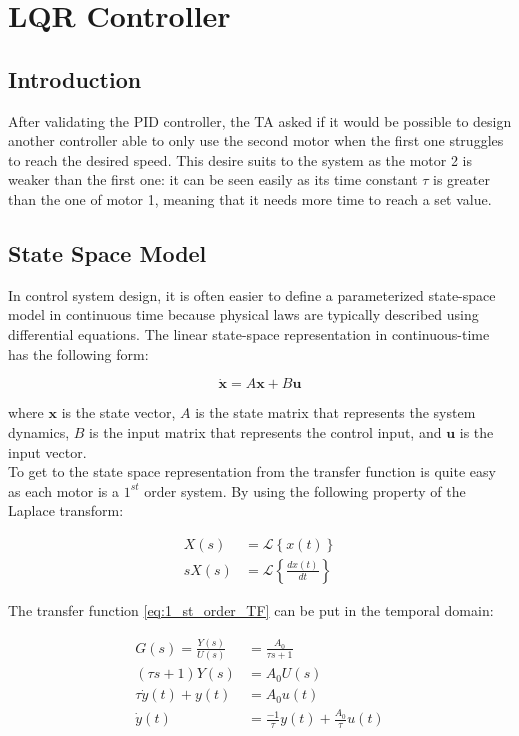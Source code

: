 \chapter{LQR Controller}

\section{Introduction}

After validating the PID controller, the TA asked if it would be possible to design another controller able to only use
the second motor when the first one struggles to reach the desired speed. This desire suits to the system as the motor 2
is weaker than the first one: it can be seen easily as its time constant $\tau$ is greater than the one of motor 1, 
meaning that it needs more time to reach a set value.

\section{State Space Model}
In control system design, it is often easier to define a parameterized state-space model in continuous time because 
physical laws are typically described using differential equations. The linear state-space representation in 
continuous-time has the following form:

\begin{equation}
    \dot{\mathbf{x}} = A \mathbf{x} + B \mathbf{u}
    \label{eq:state_space_models}
\end{equation}

where \( \mathbf{x} \) is the state vector, \( A \) is the state matrix that represents the system dynamics, 
\( B \) is the input matrix that represents the control input, and \( \mathbf{u} \) is the input vector.\\
To get to the state space representation from the transfer function is quite easy as each motor is a $1^{st}$ order
system. By using the following property of the Laplace transform:

\begin{align}
    X(s) &= \mathcal{L}\left\{x(t)\right\}\\
    s X(s) &= \mathcal{L}\left\{\frac{d x(t)}{dt}\right\}
\end{align}

The transfer function \ref{eq:1_st_order_TF} can be put in the temporal domain:

\begin{align}
    G(s) = \frac{Y(s)}{U(s)} &= \frac{A_0}{\tau s + 1}\\
    \left(\tau s + 1\right) Y(s) &= A_0 U(s)\\
    \tau \dot{y}(t) + y(t) &= A_0 u(t)\\
    \dot{y}(t) &= \frac{-1}{\tau} y(t) + \frac{A_0}{\tau} u(t)
\end{align}

